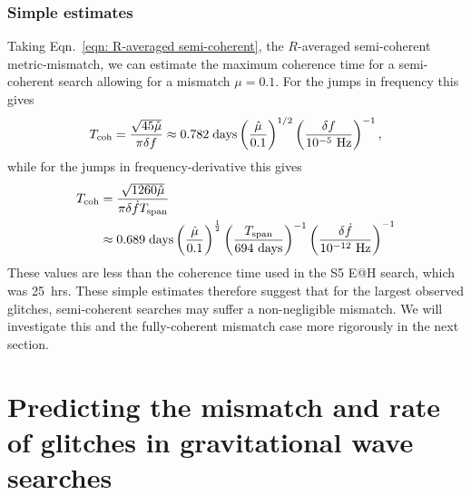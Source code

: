 \documentclass[../full_thesis/full_thesis.tex]{subfiles}
\begin{document}
\subsubsection{Simple estimates}
Taking Eqn.~\eqref{eqn: R-averaged semi-coherent}, the $R$-averaged semi-coherent
metric-mismatch,
we can estimate the maximum coherence time
for a semi-coherent search allowing for a mismatch $\mu=0.1$. For the jumps in
frequency this gives
\begin{align}
T_{\mathrm{coh}} = \frac{\sqrt{45\hat{\mu}}}{\pi\delta f}
\approx 0.782 \;\mathrm{ days}
\left(\frac{\hat{\mu}}{0.1}\right)^{1/2}
\left(\frac{\delta f}{10^{-5}\textrm{ Hz}}\right)^{-1},
\end{align}
while for the jumps in frequency-derivative this gives
\begin{align}
\begin{split}
T_{\mathrm{coh}} & = \frac{\sqrt{1260\hat{\mu}}}{\pi\delta\dot{f}T_{\mathrm{span}}} \\
& \approx 0.689 \;\mathrm{ days}
\left(\frac{\hat{\mu}}{0.1}\right)^{\frac{1}{2}}
\left(\frac{T_{\mathrm{span}}}{694 \textrm{ days}}\right)^{-1}
\left(\frac{\delta\dot{f}}{10^{-12}\textrm{ Hz}}\right)^{-1}
\end{split}
\end{align}
These values are less than the coherence time used in the S5 E@H search, which
was 25~hrs. These simple estimates therefore suggest that for the largest
observed glitches, semi-coherent searches may suffer a non-negligible mismatch.
We will investigate this and the fully-coherent mismatch case more rigorously
in the next section.

\section{Predicting the mismatch and rate of glitches in gravitational wave searches}
\label{sec: estimating the mismatch}
\end{document}
